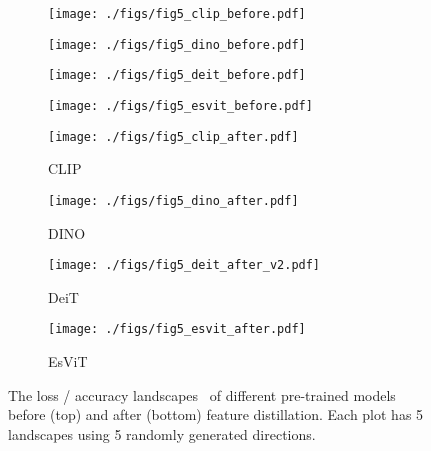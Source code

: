 \documentclass{article}
\begin{document}
\begin{figure}
\centering
\begin{subfigure}{.24\textwidth}
  \centering
  \texttt{[image: ./figs/fig5\_clip\_before.pdf]}
  \label{fig:loss_landscapes_clip_a}
\end{subfigure}\begin{subfigure}{.24\textwidth}
  \centering
  \texttt{[image: ./figs/fig5\_dino\_before.pdf]}
  \label{fig:loss_landscapes_dino_a}
\end{subfigure}
\begin{subfigure}{.24\textwidth}
  \centering
  \texttt{[image: ./figs/fig5\_deit\_before.pdf]}
  \label{fig:loss_landscapes_deit_a}
\end{subfigure}
\begin{subfigure}{.24\textwidth}
  \centering
  \texttt{[image: ./figs/fig5\_esvit\_before.pdf]}
  \label{fig:loss_landscapes_esvit_a}
\end{subfigure}

\bigskip

\begin{subfigure}{.24\textwidth}
  \centering
  \texttt{[image: ./figs/fig5\_clip\_after.pdf]}
  \caption{CLIP}
  \label{fig:loss_landscapes_clip_b}
\end{subfigure}\begin{subfigure}{.24\textwidth}
  \centering
  \texttt{[image: ./figs/fig5\_dino\_after.pdf]}
  \caption{DINO}
  \label{fig:loss_landscapes_dino_b}
\end{subfigure}
\begin{subfigure}{.24\textwidth}
  \centering
  \texttt{[image: ./figs/fig5\_deit\_after\_v2.pdf]}
  \caption{DeiT}
  \label{fig:loss_landscapes_deit_b}
\end{subfigure}
\begin{subfigure}{.24\textwidth}
  \centering
  \texttt{[image: ./figs/fig5\_esvit\_after.pdf]}
  \caption{EsViT}
  \label{fig:loss_landscapes_esvit_b}
\end{subfigure}

    \caption{The loss / accuracy landscapes~\cite{losslandscape2017} of different pre-trained models before (top) and after (bottom) feature distillation. Each plot has 5 landscapes using 5 randomly generated directions.}
    \label{fig:loss_landscapes}
\end{figure}
\end{document}

